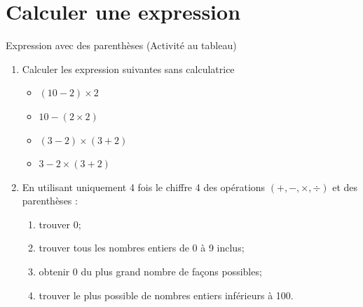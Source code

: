 \documentclass[12pt,a4paper]{article}
\begin{document}
\section{Calculer une expression}


\begin{myact}{Expression avec des parenthèses}
	(Activité au tableau)
	
	\begin{enumerate}
		\item Calculer les expression suivantes sans calculatrice
		
		\begin{multicols}{2}
			\begin{itemize}
				\item $(10 - 2)  \times 2$
				\item $ 10 - (2 \times 2 )$
				\item $ (3 -2) \times (3 + 2)$
				\item $ 3 - 2 \times (3 + 2)$
			\end{itemize}
		\end{multicols}
	
		\item En utilisant uniquement 4 fois le chiffre 4 des opérations $(+, -, \times , \div)$ et des parenthèses :
			\begin{enumerate}
				\item trouver 0;
				\item trouver tous les nombres entiers de 0 à 9 inclus;
				\item obtenir 0 du plus grand nombre de façons possibles;
				\item trouver le plus possible de nombres entiers inférieurs à 100.
			\end{enumerate}
	\end{enumerate}
\end{myact}

%				
\end{document}
